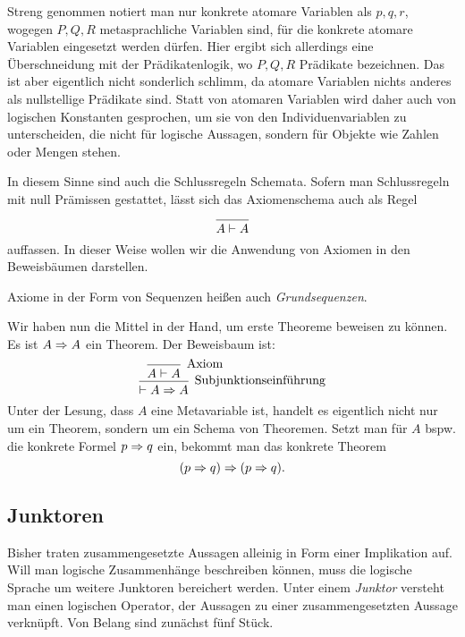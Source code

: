 Streng genommen notiert man nur konkrete atomare Variablen als $p,q,r$,
wogegen $P,Q,R$ metasprachliche Variablen sind, für die konkrete atomare
Variablen eingesetzt werden dürfen. Hier ergibt sich allerdings eine
Überschneidung mit der Prädikatenlogik, wo $P,Q,R$ Prädikate bezeichnen.
Das ist aber eigentlich nicht sonderlich schlimm, da atomare Variablen
nichts anderes als nullstellige Prädikate sind. Statt von atomaren
Variablen wird daher auch von logischen Konstanten gesprochen, um sie
von den Individuenvariablen zu unterscheiden, die nicht für logische
Aussagen, sondern für Objekte wie Zahlen oder Mengen stehen.

In diesem Sinne sind auch die Schlussregeln Schemata. Sofern man
Schlussregeln mit null Prämissen gestattet, lässt sich das
Axiomenschema auch als Regel
\[\begin{prooftree}\infer0{A\vdash A}\end{prooftree}\]
auffassen. In dieser Weise wollen wir die Anwendung von Axiomen in den
Beweisbäumen darstellen.

Axiome in der Form von Sequenzen heißen auch
\emph{Grundsequenzen}.

Wir haben nun die Mittel in der Hand, um erste Theoreme beweisen
zu können. Es ist $A\Rightarrow A$ ein Theorem. Der Beweisbaum ist:
\[\begin{prooftree}
  \infer0[Axiom]{A\vdash A}
\infer1[Subjunktionseinführung]{\vdash A\cond A}
\end{prooftree}\]
Unter der Lesung, dass $A$ eine Metavariable ist, handelt es
eigentlich nicht nur um ein Theorem, sondern um ein Schema von
Theoremen. Setzt man für $A$ bspw. die konkrete
Formel $p\Rightarrow q$ ein, bekommt man das konkrete Theorem
\[(p\Rightarrow q)\Rightarrow (p\Rightarrow q).\]

\subsection{Junktoren}

Bisher traten zusammengesetzte Aussagen alleinig in Form einer
Implikation auf. Will man logische Zusammenhänge beschreiben können,
muss die logische Sprache um weitere Junktoren bereichert werden.
Unter einem \emph{Junktor} versteht man einen logischen
Operator, der Aussagen zu einer zusammengesetzten Aussage verknüpft.
Von Belang sind zunächst fünf Stück.

